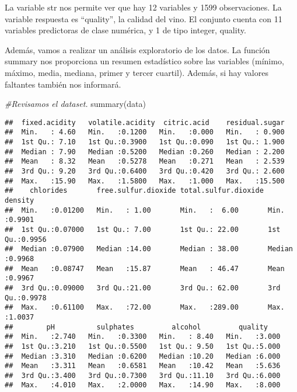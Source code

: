 \documentclass[
]{article}
\newenvironment{Shaded}{\begin{snugshade}}{\end{snugshade}}
\newcommand{\CommentTok}[1]{\textcolor[rgb]{0.56,0.35,0.01}{\textit{#1}}}
\newcommand{\FunctionTok}[1]{\textcolor[rgb]{0.00,0.00,0.00}{#1}}
\newcommand{\NormalTok}[1]{#1}
\begin{document}
La variable str nos permite ver que hay 12 variables y 1599
observaciones. La variable respuesta es ``quality'', la calidad del
vino. El conjunto cuenta con 11 variables predictoras de clase numérica,
y 1 de tipo integer, quality.

Además, vamos a realizar un análisis exploratorio de los datos. La
función summary nos proporciona un resumen estadístico sobre las
variables (mínimo, máximo, media, mediana, primer y tercer cuartil).
Además, si hay valores faltantes también nos informará.

\begin{Shaded}
\begin{Highlighting}[]
\CommentTok{\#Revisamos el dataset.}
\FunctionTok{summary}\NormalTok{(data)}
\end{Highlighting}
\end{Shaded}

\begin{verbatim}
##  fixed.acidity   volatile.acidity  citric.acid    residual.sugar  
##  Min.   : 4.60   Min.   :0.1200   Min.   :0.000   Min.   : 0.900  
##  1st Qu.: 7.10   1st Qu.:0.3900   1st Qu.:0.090   1st Qu.: 1.900  
##  Median : 7.90   Median :0.5200   Median :0.260   Median : 2.200  
##  Mean   : 8.32   Mean   :0.5278   Mean   :0.271   Mean   : 2.539  
##  3rd Qu.: 9.20   3rd Qu.:0.6400   3rd Qu.:0.420   3rd Qu.: 2.600  
##  Max.   :15.90   Max.   :1.5800   Max.   :1.000   Max.   :15.500  
##    chlorides       free.sulfur.dioxide total.sulfur.dioxide    density      
##  Min.   :0.01200   Min.   : 1.00       Min.   :  6.00       Min.   :0.9901  
##  1st Qu.:0.07000   1st Qu.: 7.00       1st Qu.: 22.00       1st Qu.:0.9956  
##  Median :0.07900   Median :14.00       Median : 38.00       Median :0.9968  
##  Mean   :0.08747   Mean   :15.87       Mean   : 46.47       Mean   :0.9967  
##  3rd Qu.:0.09000   3rd Qu.:21.00       3rd Qu.: 62.00       3rd Qu.:0.9978  
##  Max.   :0.61100   Max.   :72.00       Max.   :289.00       Max.   :1.0037  
##        pH          sulphates         alcohol         quality     
##  Min.   :2.740   Min.   :0.3300   Min.   : 8.40   Min.   :3.000  
##  1st Qu.:3.210   1st Qu.:0.5500   1st Qu.: 9.50   1st Qu.:5.000  
##  Median :3.310   Median :0.6200   Median :10.20   Median :6.000  
##  Mean   :3.311   Mean   :0.6581   Mean   :10.42   Mean   :5.636  
##  3rd Qu.:3.400   3rd Qu.:0.7300   3rd Qu.:11.10   3rd Qu.:6.000  
##  Max.   :4.010   Max.   :2.0000   Max.   :14.90   Max.   :8.000
\end{verbatim}
\end{document}
